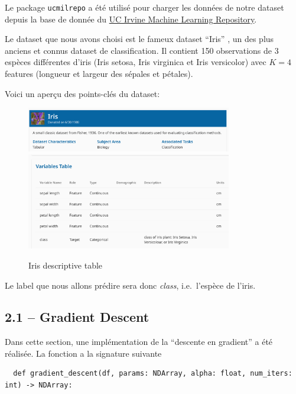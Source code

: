 \documentclass[
]{article}
\begin{document}
Le package \texttt{ucmilrepo} a été utilisé pour charger les données de
notre dataset depuis la base de donnée du
\href{https://archive.ics.uci.edu/ml/index}{UC Irvine Machine Learning
Repository}.

Le dataset que nous avons choisi est le fameux dataset ``Iris''
\cite{r.a.fisherIris1936}, un des plus anciens et connus dataset de
classification. Il contient 150 observations de 3 espèces différentes
d'iris (Iris setosa, Iris virginica et Iris versicolor) avec \(K = 4\)
features (longueur et largeur des sépales et pétales).

Voici un aperçu des points-clés du dataset:

\begin{figure}
\centering
\includegraphics[width=0.8\textwidth,height=\textheight]{../res/iris_img.png}
\includegraphics[width=0.8\textwidth,height=\textheight]{../res/iris_table.png}
\caption{Iris descriptive table}
\end{figure}

Le label que nous allons prédire sera donc \emph{class}, i.e.~l'espèce
de l'iris.

\newpage

\subsection{2.1 -- Gradient Descent}\label{gradient-descent}

Dans cette section, une implémentation de la ``descente en gradient'' a
été réalisée. La fonction a la signature suivante

\begin{lstlisting}
  def gradient_descent(df, params: NDArray, alpha: float, num_iters: int) -> NDArray:  
\end{lstlisting}
\end{document}
